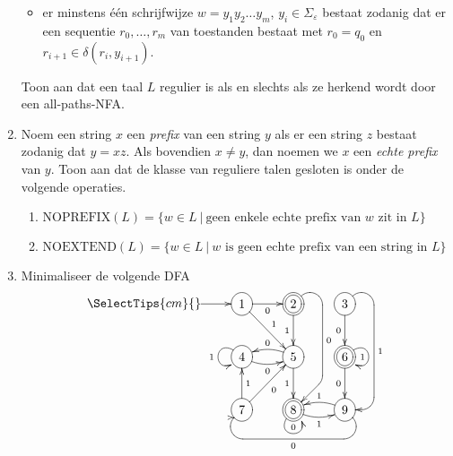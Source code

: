 \documentclass[a4paper]{article}
\begin{document}
\begin{enumerate}
\begin{itemize}
               \item er minstens \'e\'en schrijfwijze $w = y_1 y_2 \ldots y_m$, $y_i \in \Sigma_{\varepsilon}$ bestaat zodanig dat er een sequentie $r_0, \ldots, r_m$ van toestanden bestaat met $r_0 = q_0$ en $r_{i+1} \in \delta(r_i,y_{i+1})$.
            \end{itemize}
				Toon aan dat een taal $L$ regulier is als en slechts als ze herkend wordt door een all-paths-NFA.
		\item Noem een string $x$ een \emph{prefix} van een string $y$ als er een string $z$ bestaat zodanig dat $y = xz$. Als bovendien $x \neq y$, dan noemen we $x$ een \emph{echte prefix} van $y$. Toon aan dat de klasse van reguliere talen gesloten is onder de volgende operaties.
				\begin{enumerate}
					\item $\mathrm{NOPREFIX} (L) = \{ w \in L \ | \ \mbox{geen enkele echte prefix van $w$ zit in $L$} \}$
					\item $\mathrm{NOEXTEND} (L) = \{ w \in L \ | \ \mbox{$w$ is geen echte prefix van een string in $L$} \}$
				\end{enumerate}
				\item Minimaliseer de volgende DFA \\
          \[  \entrymodifiers={++[o][F-]}
            \SelectTips{cm}{}
            \xymatrix {
              *{} \ar[r] &
              1               \ar[r]_0    \ar[rd]^1                              &
              *++[o][F=]{2}   \ar[d]_1    \ar `ur_r[dd]  `[dd] `_dl[dd]^0 [dd]     &
              3               \ar `ur_d[dd] `_l[dd]^1 [dd]   \ar[d]_0                               \\
              *{} &
              4               \ar@(lu,ld)[]_1   \ar@/_/[r]_0      &
              5               \ar[d]_1          \ar@/_/[l]_0      &
              *++[o][F=]{6}   \ar@(ru,rd)[]_1   \ar[d]_0          \\
              *{} &
              7               \ar[u]_1          \ar[ru]_0                     &
              *++[o][F=]{8}   \ar@(ld,rd)[]^0   \ar@/_/[r]_1                  &
             9                \ar@/_/[l]_1      \ar `dr_l[ll] `_ur[ll]^0 [ll]  \\
         } \]


\end{enumerate}
\end{document}
